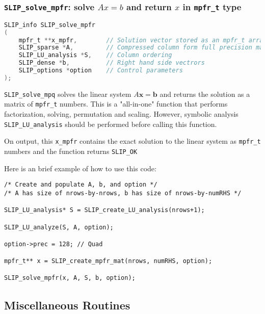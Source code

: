 \documentclass[12pt]{article}
\theoremstyle{definition}
\begin{document}
\cprotect\subsubsection{\verb|SLIP_solve_mpfr|: solve $Ax=b$ and return $x$ in \verb|mpfr_t| type}\label{ss:SLIP_solve_mpfr}

\begin{lstlisting}[language=C,frame=single]
SLIP_info SLIP_solve_mpfr
(
    mpfr_t **x_mpfr,        // Solution vector stored as an mpfr_t array
    SLIP_sparse *A,         // Compressed column form full precision matrix A
    SLIP_LU_analysis *S,    // Column ordering
    SLIP_dense *b,          // Right hand side vectrors
    SLIP_options *option    // Control parameters
);
\end{lstlisting}

\verb|SLIP_solve_mpq| solves the linear system $A\mathbf{x}=\mathbf{b}$ and returns the solution as a matrix of \verb|mpfr_t| numbers. This is a "all-in-one" function that performs factorization, solving, permutation and scaling. However, symbolic analysis \verb|SLIP_LU_analysis| should be performed before calling this function.

On output, this \verb|x_mpfr| contains the exact solution to the linear system as \verb|mpfr_t| numbers and the function returns \verb|SLIP_OK|

Here is an brief example of how to use this code:

\begin{verbatim}
/* Create and populate A, b, and option */
/* A has size of nrows-by-nrows, b has size of nrows-by-numRHS */

SLIP_LU_analysis* S = SLIP_create_LU_analysis(nrows+1);

SLIP_LU_analyze(S, A, option);

option->prec = 128; // Quad

mpfr_t** x = SLIP_create_mpfr_mat(nrows, numRHS, option);

SLIP_solve_mpfr(x, A, S, b, option);

\end{verbatim}










\subsection{Miscellaneous Routines}\label{s:miscellaneous_routine}
\end{document}
